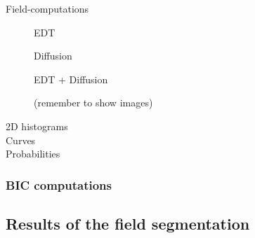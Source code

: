 \begin{description}
    \item[Field-computations]

    EDT

    Diffusion

    EDT + Diffusion

    (remember to show images)

    \item[2D histograms]

    \item[Curves]

    \item[Probabilities]
\end{description}

\subsubsection{BIC computations}

\subsection{Results of the field segmentation}

